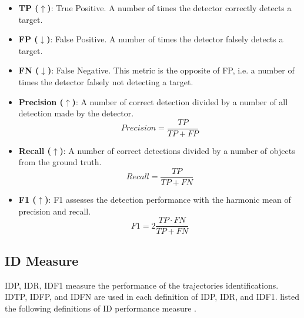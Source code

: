 \begin{itemize}

\item \textbf{TP ($\uparrow$)}: True Positive. A number of times the detector correctly detects a target. 

\item \textbf{FP ($\downarrow$)}: False Positive. A number of times the detector falsely detects a target.

\item \textbf{FN ($\downarrow$)}: False Negative. This metric is the opposite of FP, i.e. a number of times the detector falsely not detecting a target.

\item \textbf{Precision ($\uparrow$)}: A number of correct detection divided by a number of all detection made by the detector.
\begin{equation}
Precision = \frac{TP}{TP + FP}
\label{eqn:Precision}
\end{equation}

\item \textbf{Recall ($\uparrow$)}: A number of correct detections divided by a number of objects from the ground truth.
\begin{equation}
Recall = \frac{TP}{TP + FN}
\label{eqn:Recall}
\end{equation}

\item \textbf{F1 ($\uparrow$)}: F1 assesses the detection performance with the harmonic mean of precision and recall.
\begin{equation}
F1 = 2\frac{TP \cdot FN}{TP + FN}
\label{eqn:F1}
\end{equation}

\end{itemize}




\subsection{ID Measure}
IDP, IDR, IDF1 measure the performance of the trajectories identifications. IDTP, IDFP, and IDFN are used in each definition of IDP, IDR, and IDF1. \citeauthor{ristani_performance_2016} listed the following definitions of ID performance measure \cite{ristani_performance_2016}.

